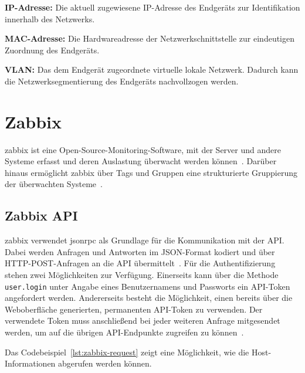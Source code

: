 \begin{compactitem}

    \item \textbf{IP-Adresse:} Die aktuell zugewiesene IP-Adresse des
    Endgeräts zur Identifikation innerhalb des Netzwerks.

    \item \textbf{MAC-Adresse:} Die Hardwareadresse der
    Netzwerkschnittstelle zur eindeutigen Zuordnung des Endgeräts.

    \item \textbf{VLAN:} Das dem Endgerät zugeordnete virtuelle lokale
    Netzwerk. Dadurch kann die Netzwerksegmentierung des Endgeräts
    nachvollzogen werden.

\end{compactitem}

\section{Zabbix}
\label{sec:zabbix}

\gls{zabbix} ist eine Open-Source-Monitoring-Software, mit der Server und
andere Systeme erfasst und deren Auslastung überwacht werden
können~\cite{zabbix2026about}. Darüber hinaus ermöglicht \gls{zabbix} über
Tags und Gruppen eine strukturierte Gruppierung der überwachten
Systeme~\cite{zabbix2026about}.

\subsection{Zabbix API}
\label{subsec:zabbix-api}

\gls{zabbix} verwendet \gls{jsonrpc} als Grundlage für die Kommunikation mit 
der API. Dabei werden Anfragen und Antworten im JSON-Format kodiert und über 
HTTP-POST-Anfragen an die API übermittelt~\cite{zabbix2026api}. Für die Authentifizierung 
stehen zwei Möglichkeiten zur Verfügung. Einerseits kann über die Methode \texttt{user.login} 
unter Angabe eines Benutzernamens und Passworts ein API-Token angefordert werden. Andererseits 
besteht die Möglichkeit, einen bereits über die Weboberfläche generierten, permanenten API-Token 
zu verwenden. Der verwendete Token muss anschließend bei jeder weiteren Anfrage mitgesendet werden, 
um auf die übrigen API-Endpunkte zugreifen zu können~\cite{zabbix2026api}.

Das Codebeispiel~\ref{lst:zabbix-request} zeigt eine Möglichkeit, wie die Host-Informationen abgerufen
werden können.

